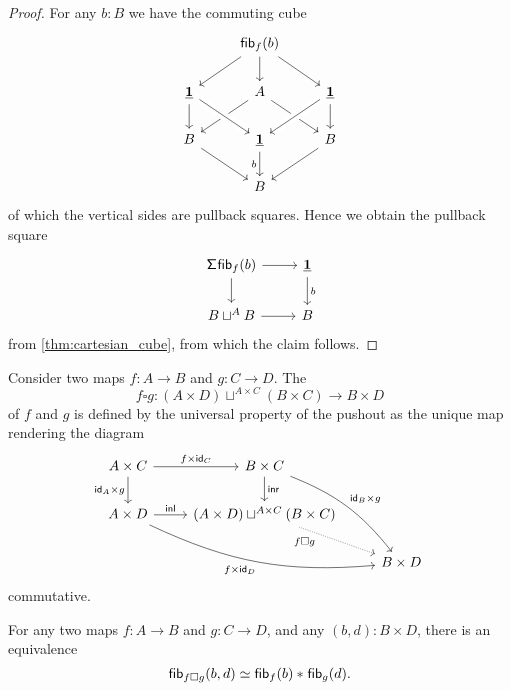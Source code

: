 \begin{proof}
For any $b:B$ we have the commuting cube 
\begin{equation*}
\begin{tikzcd}
& \fib{f}{b} \arrow[dl] \arrow[d] \arrow[dr] \\
\unit \arrow[d] & A \arrow[dl] \arrow[dr] & \unit \arrow[dl,crossing over] \arrow[d] \\
B \arrow[dr] & \unit \arrow[from=ul,crossing over] \arrow[d,swap,"b"] & B \arrow[dl] \\
& B
\end{tikzcd}
\end{equation*}
of which the vertical sides are pullback squares. Hence we obtain the pullback square
\begin{equation*}
\begin{tikzcd}
\susp{\fib{f}{b}} \arrow[r] \arrow[d] & \unit \arrow[d,"b"] \\
B\sqcup^{A} B \arrow[r] & B
\end{tikzcd}
\end{equation*}
from \cref{thm:cartesian_cube}, from which the claim follows.
\end{proof}

\begin{defn}
Consider two maps $f:A\to B$ and $g:C\to D$.
The 
\begin{equation*}
f\square g : (A\times D)\sqcup^{A\times C} (B\times C)\to B\times D
\end{equation*}
of $f$ and $g$ is defined by the universal property of the pushout as the unique map rendering the diagram
\begin{equation*}
\begin{tikzcd}
A\times C \arrow[r,"{f\times \idfunc[C]}"] \arrow[d,swap,"{\idfunc[A]\times g}"] & B\times C \arrow[d,"\inr"] \arrow[ddr,bend left=15,"{\idfunc[B]\times g}"] \\
A\times D \arrow[r,"\inl"] \arrow[drr,bend right=15,swap,"{f\times\idfunc[D]}"] & (A\times D)\sqcup^{A\times C} (B\times C) \arrow[dr,densely dotted,swap,near start,"f\square g"] \\
& & B\times D
\end{tikzcd}
\end{equation*}
commutative.
\end{defn}

\begin{prp}
For any two maps $f:A\to B$ and $g:C\to D$, and any $(b,d):B\times D$, there is an equivalence
\begin{equation*}
\eqv{\fib{f\square g}{b,d}}{\join{\fib{f}{b}}{\fib{g}{d}}}.
\end{equation*}
\end{prp}

